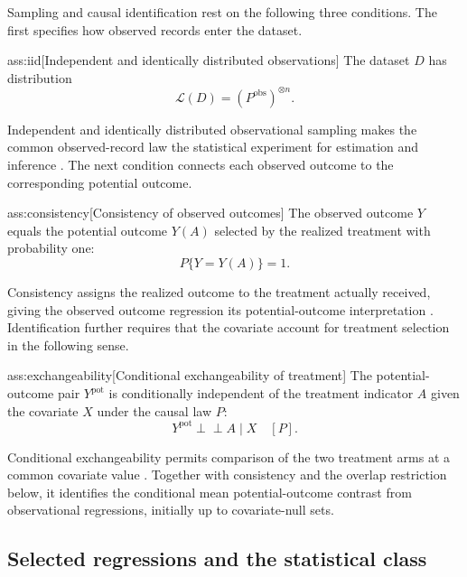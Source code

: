 \documentclass[11pt]{article}
\begin{document}
Sampling and causal identification rest on the following three conditions. The first specifies how observed records enter the dataset.

\begin{assumptionv}{ass:iid}[Independent and identically distributed observations]
The dataset \(D\) has distribution
\[
\mathcal L(D)=(P^{\mathrm{obs}})^{\otimes n}.
\]
\end{assumptionv}

Independent and identically distributed observational sampling makes the common observed-record law the statistical experiment for estimation and inference \citep{KennedyBalakrishnanRobinsWasserman2024}. The next condition connects each observed outcome to the corresponding potential outcome.

\begin{assumptionv}{ass:consistency}[Consistency of observed outcomes]
The observed outcome \(Y\) equals the potential outcome \(Y(A)\) selected by the realized treatment with probability one:
\[
P\{Y=Y(A)\}=1.
\]
\end{assumptionv}

Consistency assigns the realized outcome to the treatment actually received, giving the observed outcome regression its potential-outcome interpretation \citep{KennedyBalakrishnanRobinsWasserman2024}. Identification further requires that the covariate account for treatment selection in the following sense.

\begin{assumptionv}{ass:exchangeability}[Conditional exchangeability of treatment]
The potential-outcome pair \(Y^{\mathrm{pot}}\) is conditionally independent of the treatment indicator \(A\) given the covariate \(X\) under the causal law \(P\):
\[
Y^{\mathrm{pot}}\perp\!\!\!\perp A\mid X\quad[P].
\]
\end{assumptionv}

Conditional exchangeability permits comparison of the two treatment arms at a common covariate value \citep{KennedyBalakrishnanRobinsWasserman2024}. Together with consistency and the overlap restriction below, it identifies the conditional mean potential-outcome contrast from observational regressions, initially up to covariate-null sets.

\subsection{Selected regressions and the statistical class}
\end{document}
